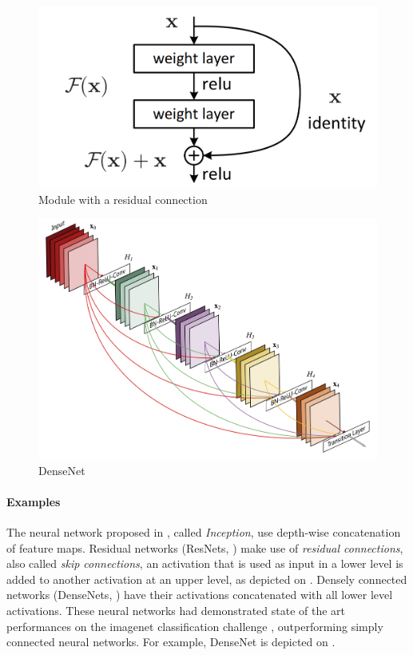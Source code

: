 \begin{figure}[p]
\centering\includegraphics[scale=0.2]{chapter1/resnetmodule.png}
\caption{Module with a residual connection \citep{he2016deep}}
\label{fig:resnet}
\end{figure}

\begin{figure}[p]
\centering\includegraphics[scale=0.07]{chapter1/densenet.jpg}
\caption{DenseNet \citep{huang2017densely}}
\label{fig:densenet}
\end{figure}

\paragraph{Examples}
The neural network proposed in \citep{szegedy2015going}, called \emph{Inception}, use depth-wise concatenation of feature maps. Residual networks (ResNets, \cite{he2016deep}) make use of \emph{residual connections}, also called \emph{skip connections}, \ie an activation that is used as input in a lower level is added to another activation at an upper level, as depicted on . Densely connected networks (DenseNets, \cite{huang2017densely}) have their activations concatenated with all lower level activations. These neural networks had demonstrated state of the art performances on the imagenet classification challenge \citep{deng2009imagenet}, outperforming simply connected neural networks. For example, DenseNet is depicted on .
\label{par:branching_ex}

